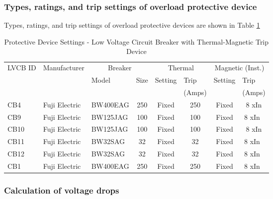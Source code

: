 \subsubsection{Types, ratings, and trip settings of overload protective device}
Types, ratings, and trip settings of overload protective devices are shown in Table \ref{tbl_ch04_elecaudit_tripsetting}
\begin{table}[!htb]
	\caption{Protective Device Settings - Low Voltage Circuit Breaker with Thermal-Magnetic Trip Device}
	\label{tbl_ch04_elecaudit_tripsetting}
	{\scriptsize
		
\begin{tabular}{l|l|l|l|l|l|l|l}
	\hline
	LVCB ID & Manufacturer & \multicolumn{2}{c|}{Breaker} & \multicolumn{2}{c|}{Thermal} & \multicolumn{2}{c}{Magnetic (Inst.)} \\ 
	\cline{3-8}
	&  & Model & Size & Setting & Trip & Setting & Trip \\ 
	&  &  &  &  & (Amps) &  & (Amps) \\ 
	\hline
	CB4 & Fuji Electric & BW400EAG & \multicolumn{1}{c|}{250} & \multicolumn{1}{c|}{Fixed} & \multicolumn{1}{c|}{250} & \multicolumn{1}{c|}{Fixed} & \multicolumn{1}{c}{8 xIn} \\ 
	CB9 & Fuji Electric & BW125JAG & \multicolumn{1}{c|}{100} & \multicolumn{1}{c|}{Fixed} & \multicolumn{1}{c|}{100} & \multicolumn{1}{c|}{Fixed} & \multicolumn{1}{c}{8 xIn } \\ 
	CB10 & Fuji Electric & BW125JAG & \multicolumn{1}{c|}{100} & \multicolumn{1}{c|}{Fixed} & \multicolumn{1}{c|}{100} & \multicolumn{1}{c|}{Fixed} & \multicolumn{1}{c}{8 xIn} \\ 
	CB11 & Fuji Electric & BW32SAG & \multicolumn{1}{c|}{32} & \multicolumn{1}{c|}{Fixed} & \multicolumn{1}{c|}{32} & \multicolumn{1}{c|}{Fixed} & \multicolumn{1}{c}{8 xIn } \\ 
	CB12 & Fuji Electric & BW32SAG & \multicolumn{1}{c|}{32} & \multicolumn{1}{c|}{Fixed} & \multicolumn{1}{c|}{32} & \multicolumn{1}{c|}{Fixed} & \multicolumn{1}{c}{8 xIn } \\ 
	CB1 & Fuji Electric & BW400EAG & \multicolumn{1}{c|}{250} & \multicolumn{1}{c|}{Fixed} & \multicolumn{1}{c|}{250} & \multicolumn{1}{c|}{Fixed} & \multicolumn{1}{c}{8 xIn } \\ 
	\hline
\end{tabular}

		
	}%
\end{table}
\subsubsection{Calculation of voltage drops }


